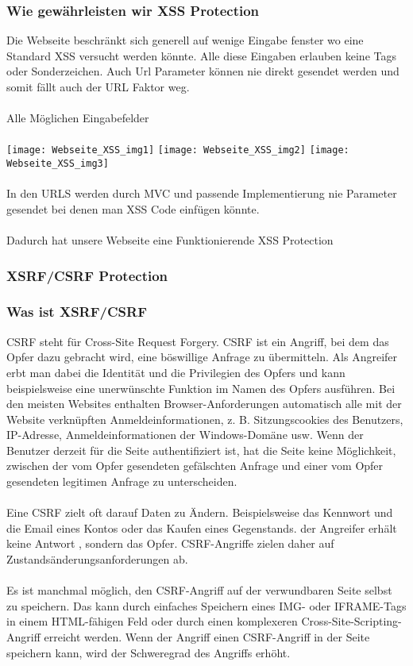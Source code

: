 {\subsubsection{Wie gewährleisten wir XSS Protection}
Die Webseite beschränkt sich generell auf wenige Eingabe fenster wo eine Standard XSS versucht werden könnte. Alle diese Eingaben erlauben keine Tags oder Sonderzeichen. Auch Url Parameter können nie direkt gesendet werden und somit fällt auch der URL Faktor weg.
\\ \\
Alle Möglichen Eingabefelder
\\ \\
\texttt{[image: Webseite\_XSS\_img1]}
\texttt{[image: Webseite\_XSS\_img2]}
\texttt{[image: Webseite\_XSS\_img3]}
\\ \\
In den URLS werden durch MVC und passende Implementierung nie Parameter gesendet bei denen man XSS Code einfügen könnte.\\ \\
Dadurch hat unsere Webseite eine Funktionierende XSS Protection

\subsubsection{XSRF/CSRF Protection}
\label{sec:csrf}
\subsubsection{Was ist XSRF/CSRF}
CSRF steht für Cross-Site Request Forgery. CSRF ist ein Angriff, bei dem das Opfer dazu gebracht wird, eine böswillige Anfrage zu übermitteln. Als Angreifer erbt man dabei die Identität und die Privilegien des Opfers und kann beispielsweise eine unerwünschte Funktion im Namen des Opfers ausführen. Bei den meisten Websites enthalten Browser-Anforderungen automatisch alle mit der Website verknüpften Anmeldeinformationen, z. B. Sitzungscookies des Benutzers, IP-Adresse, Anmeldeinformationen der Windows-Domäne usw. Wenn der Benutzer derzeit für die Seite authentifiziert ist, hat die Seite keine Möglichkeit, zwischen der vom Opfer gesendeten gefälschten Anfrage und einer vom Opfer gesendeten legitimen Anfrage zu unterscheiden.
\\ \\
Eine CSRF zielt oft darauf Daten zu Ändern. Beispielsweise das Kennwort und die Email eines Kontos oder das Kaufen eines Gegenstands.   der Angreifer erhält keine Antwort , sondern das Opfer. CSRF-Angriffe zielen daher auf Zustandsänderungsanforderungen ab.
\\ \\
Es ist manchmal möglich, den CSRF-Angriff auf der verwundbaren Seite selbst zu speichern. Das kann durch einfaches Speichern eines IMG- oder IFRAME-Tags in einem HTML-fähigen Feld oder durch einen komplexeren Cross-Site-Scripting-Angriff erreicht werden. Wenn der Angriff einen CSRF-Angriff in der Seite speichern kann, wird der Schweregrad des Angriffs erhöht. 

}
